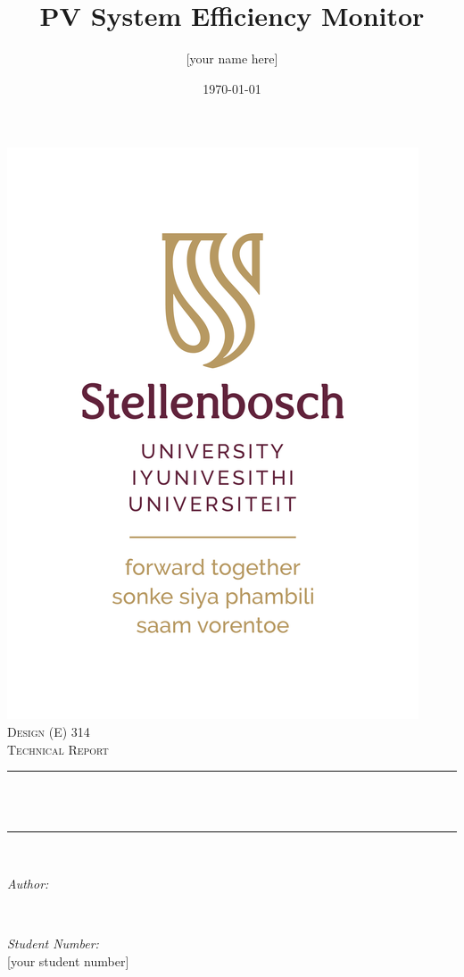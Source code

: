 \documentclass[11pt,a4paper]{article}
\title{PV System Efficiency Monitor} %
\author{[your name here] \textsc{}} %
\date{\today} %
\makeatletter
\let\thetitle\@title
\let\theauthor\@author
\let\thedate\@date
\makeatother
\begin{document}
	
	\begin{titlepage}
		\centering
		\vspace*{0.5 cm}
		\includegraphics[scale = 1.5]{SU_logo_RGB-01.png}\\[1.0 cm]   %
		\textsc{\LARGE Design (E) 314 \\ Technical Report}\\[0.5 cm]               %
		\rule{\linewidth}{0.2 mm} \\[0.4 cm]
		{ \huge \bfseries \thetitle }\\[0.4 cm]
		\rule{\linewidth}{0.2 mm} \\[1.5 cm]
		
		\begin{minipage}{6.5cm}
			\begin{flushleft} \large
				\emph{Author:}\\
				\theauthor
			\end{flushleft}
		\end{minipage}~
		\begin{minipage}{6.5cm}
			\begin{flushright} \large
				\emph{Student Number:} \\
				{[your student number] }                                 %
			\end{flushright}
		\end{minipage}\\[2 cm]
		
		{\large \thedate}\\[2 cm]
		
		\vfill
		
	\end{titlepage}
	
\end{document}
